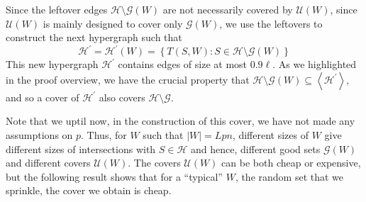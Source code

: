 \documentclass[12pt,oneside,reqno]{amsart}
\theoremstyle{definition}
\numberwithin{equation}{theorem}
\newcommand{\cG}{{\mathcal G}}
\newcommand{\cH}{{\mathcal H}}
\newcommand{\cU}{{\mathcal U}}
\begin{document}
Since the leftover edges $\cH \setminus \cG(W)$ are not necessarily covered by $\cU(W)$, since $\cU(W)$ is mainly designed to cover only $\cG(W)$, we use the leftovers to construct the next hypergraph such that
\begin{equation}\label{nexthypergraph}
\cH^{\prime} = \cH^{\prime}(W) = \left\{T(S,W): S \in \cH \setminus \cG(W) \right\}
\end{equation}
This new hypergraph $\cH^{\prime}$ contains edges of size at most $0.9\ell$. As we highlighted in the proof overview, we have the crucial property that $\mathcal{H} \setminus \mathcal{G}(W) \subseteq\left\langle\mathcal{H}^{\prime}\right\rangle$, and so a cover of $\cH^{\prime}$ also covers $\mathcal{H} \setminus \mathcal{G}$. 

Note that we uptil now, in the construction of this cover, we have not made any assumptions on $p$. Thus, for $W$ such that $|W| = Lpn$, different sizes of $W$ give different sizes of intersections with $S \in \cH$ and hence, different good sets $\cG(W)$ and different covers $\cU(W)$. The covers $\cU(W)$ can be both cheap or expensive, but the following result shows that for a ``typical'' $W$, the random set that we sprinkle, the cover we obtain is cheap.
\end{document}
